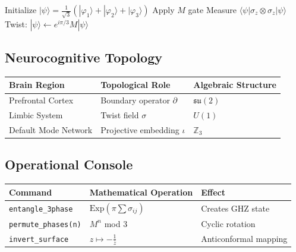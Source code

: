 \documentclass[12pt]{article}
\begin{document}
\begin{algorithm}[H]
\caption{Möbius Cognition Loop}
\begin{algorithmic}[1]
\State Initialize \( |\psi\rangle = \frac{1}{\sqrt{3}}(|\varphi_1\rangle + |\varphi_2\rangle + |\varphi_3\rangle) \)
    \State Apply \( M \) gate
    \State Measure \( \langle \psi | \sigma_z \otimes \sigma_z | \psi \rangle \)
    \State Twist: \( |\psi\rangle \leftarrow e^{i\pi/3}M|\psi\rangle \)
\EndFor
\end{algorithmic}
\end{algorithm}

\subsection{Neurocognitive Topology}

\begin{table}[h]
\centering
\begin{tabular}{|l|l|l|}
\hline
\textbf{Brain Region} & \textbf{Topological Role} & \textbf{Algebraic Structure} \\ \hline
Prefrontal Cortex & Boundary operator \( \partial \) & \( \mathfrak{su}(2) \) \\ \hline
Limbic System & Twist field \( \sigma \) & \( U(1) \) \\ \hline
Default Mode Network & Projective embedding \( \iota \) & \( \mathbb{Z}_3 \) \\ \hline
\end{tabular}
\end{table}

\subsection{Operational Console}

\begin{table}[h]
\centering
\begin{tabular}{|l|l|l|}
\hline
\textbf{Command} & \textbf{Mathematical Operation} & \textbf{Effect} \\ \hline
\texttt{entangle\_3phase} & \( \text{Exp}(\pi \sum \sigma_{ij}) \) & Creates GHZ state \\ \hline
\texttt{permute\_phases(n)} & \( M^n \) mod 3 & Cyclic rotation \\ \hline
\texttt{invert\_surface} & \( z \mapsto -\frac{1}{\bar{z}} \) & Anticonformal mapping \\ \hline
\end{tabular}
\end{table}
\end{document}

